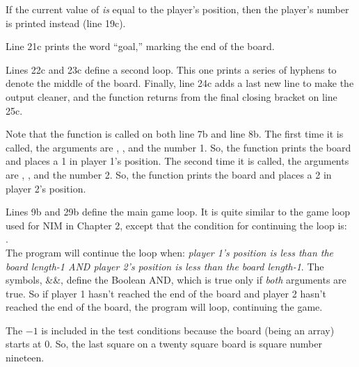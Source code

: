 If the current value of  \emph{is} equal to the player's position, then the player's number is printed instead (line 19c).  

Line 21c prints the word ``goal,'' marking the end of the board.

Lines 22c and 23c define a second  loop.  This one prints a series of hyphens to denote the middle of the board.  Finally, line 24c adds a last new line to make the output cleaner, and the function returns from the final closing bracket on line 25c.

Note that the  function is called on both line 7b and line 8b.  The first time it is called, the arguments are , , and the number 1.  So, the function prints the board and places a 1 in player 1's position.  The second time it is called, the arguments are , , and the number 2.  So, the function prints the board and places a 2 in player 2's position.  


Lines 9b and 29b define the main game loop.  It is quite similar to the game loop used for NIM in Chapter 2, except that the condition for continuing the loop is:\\
.\\
The program will continue the loop when: 
\emph{player 1's position is less than the board length-1 AND player 2's position is less than the board length-1}.
 The symbols, \&\&, define the Boolean AND, which is true only if \emph{both} arguments are true.  So if player 1 hasn't reached the end of the board and player 2 hasn't reached the end of the board, the program will loop, continuing the game. 

The $-1$ is included in the test conditions because the board (being an array) starts at 0.  So, the last square on a twenty square board is square number nineteen. 


